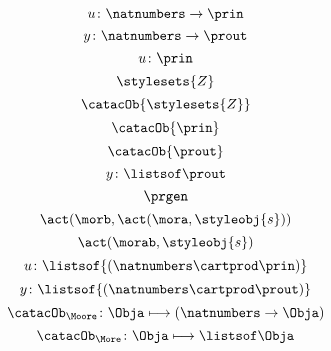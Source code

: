 {\begin{forslides}
        \begin{equation}
            \label{eq:prgen-u-1}
            u\colon \natnumbers \to \prin
        \end{equation}
        \begin{equation}
            \label{eq:prgen-y-1}
            y\colon \natnumbers \to \prout
        \end{equation}
        \begin{equation}
            \label{eq:prgen-u-2}
            u\colon \prin
        \end{equation}
        \begin{equation}
            \label{eq:Z}
            \stylesets{Z}
        \end{equation}
        \begin{equation}
            \label{eq:Za}
            \catacOb{\stylesets{Z}}
        \end{equation}
        \begin{equation}
            \label{eq:Ua}
            \catacOb{\prin}
        \end{equation}
        \begin{equation}
            \label{eq:Ya}
            \catacOb{\prout}
        \end{equation}
        \begin{equation}
            \label{eq:prgen-y-2}
            y\colon \listsof  \prout
        \end{equation}
        \begin{equation}
            \label{eq:prgen}
            \prgen
        \end{equation}
        \begin{equation}
            \label{eq:now1}
            \act(\morb, \act(\mora, \styleobj{s}))
        \end{equation}
        \begin{equation}
            \label{eq:now2}
            \act(\morab, \styleobj{s})
        \end{equation}
        \begin{equation}
            \label{eq:ev-sign}
            u\colon \listsof{(\natnumbers \cartprod \prin)}
        \end{equation}
        \begin{equation}
            \label{eq:ev-sign2}
            y\colon \listsof{(\natnumbers \cartprod \prout)}
        \end{equation}
        \begin{equation}
            \label{eq:phi-moore}
            {\catacOb_{\Moore}}\colon{\Obja}\longmapsto{(\natnumbers \to \Obja)}
        \end{equation}
        \begin{equation}
            \label{eq:phi-more}
            {\catacOb_{\More}}\colon{\Obja}\longmapsto{\listsof \Obja}
        \end{equation}


\end{forslides}}
